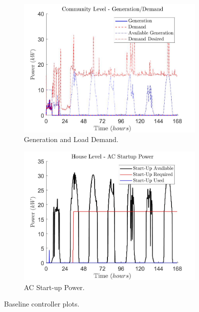 \documentclass[11pt,usenames]{article}
\begin{document}
\begin{figure}[!t]
	\begin{subfigure}[t]{0.48\textwidth}
		\centering
		\includegraphics[scale=0.3]{Gainesville_BaseLine_7DayTest_SC_PVBat1_Bat1_PV1_None1_SCL2_Community_P_Generated_Demand.JPG}
		\caption{Generation and Load Demand.}
		\label{fig:GenDemand_1}
	\end{subfigure} 
	\begin{subfigure}[t]{0.48\textwidth}
		\centering
		\includegraphics[scale=0.3]{Gainesville_BaseLine_7DayTest_SC_PVBat1_Bat1_PV1_None1_SCL2_Community_AC_StartUpPower_Av_Req_U.JPG}
		\caption{AC Start-up Power.}
		\label{fig:AcStartUp_1}
	\end{subfigure} 
	\caption{Baseline controller plots.}
	\label{fig:Results_Baseline}
\end{figure}
\end{document}
